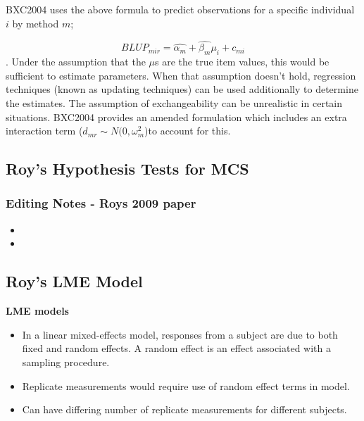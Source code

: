 \documentclass[compress]{beamer}        %
\makeatletter
\newcommand{\tcb}{\textcolor{beamer@blendedblue}}
\makeatother
\begin{document}
\begin{frame}
\alert{BXC2004} uses the above formula to predict observations for
a specific individual $i$ by method $m$;

\begin{equation}BLUP_{mir} = \hat{\alpha_{m}} + \hat{\beta_{m}}\mu_{i} +
c_{mi} \end{equation}. Under the assumption that the $\mu$s are
the true item values, this would be sufficient to estimate
parameters. When that assumption doesn't hold, regression
techniques (known as updating techniques) can be used additionally
to determine the estimates. The assumption of exchangeability can
be unrealistic in certain situations. \alert{BXC2004} provides an
amended formulation which includes an extra interaction term ($
d_{mr} \sim N(0,\omega^{2}_{m}$)to account for this.

\end{frame}


\subsection{Roy's Hypothesis Tests for MCS}


\begin{frame}
\frametitle{Editing Notes - Roys 2009 paper}
\begin{itemize}
\item 
\item
\end{itemize}
\end{frame}
\subsection*{Roy's LME Model}
\begin{frame}{\bf \tcb{LME models}}
\begin{itemize}\itemsep0.7cm
\item In a linear mixed-effects model, responses from a subject are due to both fixed and random
effects. A random effect is an effect associated with a sampling procedure.
\item Replicate measurements would require use of random effect terms in model.
\item Can have differing number of replicate measurements for different subjects.
\end{itemize}
\end{frame}
\end{document}
